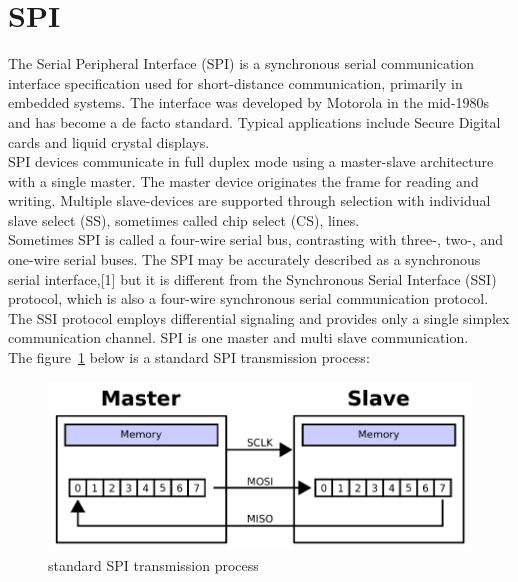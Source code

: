 \section{SPI}
\label{sec:SPI}
The Serial Peripheral Interface (SPI) is a synchronous serial communication interface specification used for short-distance communication, primarily in embedded systems. The interface was developed by Motorola in the mid-1980s and has become a de facto standard. Typical applications include Secure Digital cards and liquid crystal displays.
\\
SPI devices communicate in full duplex mode using a master-slave architecture with a single master. The master device originates the frame for reading and writing. Multiple slave-devices are supported through selection with individual slave select (SS), sometimes called chip select (CS), lines.
\\
Sometimes SPI is called a four-wire serial bus, contrasting with three-, two-, and one-wire serial buses. The SPI may be accurately described as a synchronous serial interface,[1] but it is different from the Synchronous Serial Interface (SSI) protocol, which is also a four-wire synchronous serial communication protocol. The SSI protocol employs differential signaling and provides only a single simplex communication channel. SPI is one master and multi slave communication.
\\
The figure~\ref{fig:2.12}  below is a standard SPI transmission process:
\begin{figure}[!ht]
	\centering
	\includegraphics[width=13cm]{grafiken/2.12.pdf}
	\caption{standard SPI transmission process} 
	\label{fig:2.12}
\end{figure}
\FloatBarrier

